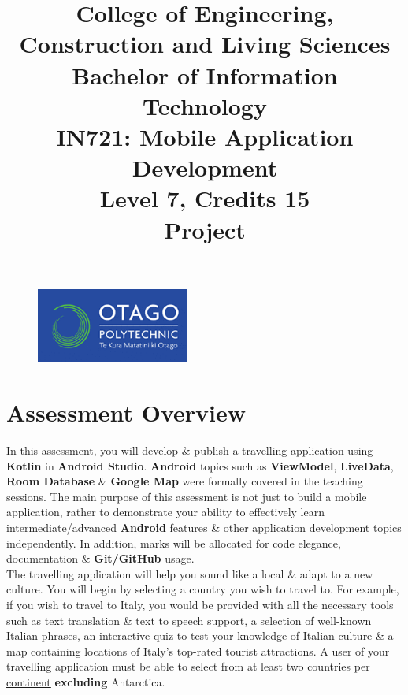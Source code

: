 \documentclass{article}
\author{}
\begin{document}
\begin{figure}
	\centering
	\includegraphics[width=50mm]{../../resources/img/logo.png}
\end{figure}

\title{College of Engineering, Construction and Living Sciences\\Bachelor of Information Technology\\IN721: Mobile Application Development\\Level 7, Credits 15\\\textbf{Project}}
\date{}
\maketitle

\section*{Assessment Overview}
In this assessment, you will develop \& publish a travelling application using \textbf{Kotlin} in \textbf{Android Studio}. \textbf{Android} topics such as \textbf{ViewModel}, \textbf{LiveData}, \textbf{Room Database} \& \textbf{Google Map} were formally covered in the teaching sessions. The main purpose of this assessment is not just to build a mobile application, rather to demonstrate your ability to effectively learn intermediate/advanced \textbf{Android} features \& other application development topics independently. In addition, marks will be allocated for code elegance, documentation \& \textbf{Git/GitHub} usage. \\

The travelling application will help you sound like a local \& adapt to a new culture. You will begin by selecting a country you wish to travel to. For example, if you wish to travel to Italy, you would be provided with all the necessary tools such as text translation \& text to speech support, a selection of well-known Italian phrases, an interactive quiz to test your knowledge of Italian culture \& a map containing locations of Italy's top-rated tourist attractions. A user of your travelling application must be able to select from at least two countries per \href{https://www.worldometers.info/geography/7-continents/}{continent} \textbf{excluding} Antarctica. 
\end{document}
